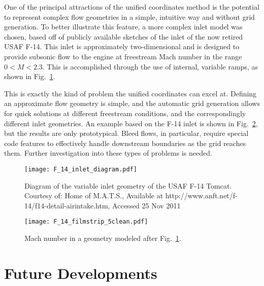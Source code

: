 One of the principal attractions of the unified coordinates method is the potential to represent complex flow geometries in a simple, intuitive way and without grid generation. To better illustrate this feature, a more complex inlet model was chosen, based off of publicly available sketches of the inlet of the now retired USAF F-14. This inlet is approximately two-dimensional and is designed to provide subsonic flow to the engine at freestream Mach number in the range $0 < M < 2.3$. This is accomplished through the use of internal, variable ramps, as shown in Fig.~\ref{fig:f-14-diagram}.

This is exactly the kind of problem the unified coordinates can excel at. Defining an approximate flow geometry is simple, and the automatic grid generation allows for quick solutions at different freestream conditions, and the correspondingly different inlet geometries.
An example based on the F-14 inlet is shown in Fig.~\ref{fig:f-14-flow}, but the results are only prototypical. Bleed flows, in particular, require special code features to effectively handle downstream boundaries as the grid reaches them. Further investigation into these types of problems is needed.

\begin{figure}[p]
   \centering
   \texttt{[image: F\_14\_inlet\_diagram.pdf]}
   \vspace{-1.5in}
   \caption[Diagram of USAF F-14 Tomcat]{Diagram of the variable inlet
     geometry of the USAF F-14 Tomcat. Courtesy of: Home of M.A.T.S.,
     Available at http://www.anft.net/f-14/f14-detail-airintake.htm,
     Accessed 25 Nov 2011}
   \label{fig:f-14-diagram}
\end{figure}

\begin{figure}[htbp]
   \centering
   \texttt{[image: F\_14\_filmstrip\_5clean.pdf]}
   \caption[Mach Number in F-14 Inlet]{Mach number in a geometry modeled after Fig.~\ref{fig:f-14-diagram}.}
   \label{fig:f-14-flow}
\end{figure}

\section{Future Developments}
\label{sec:UCS-future}

